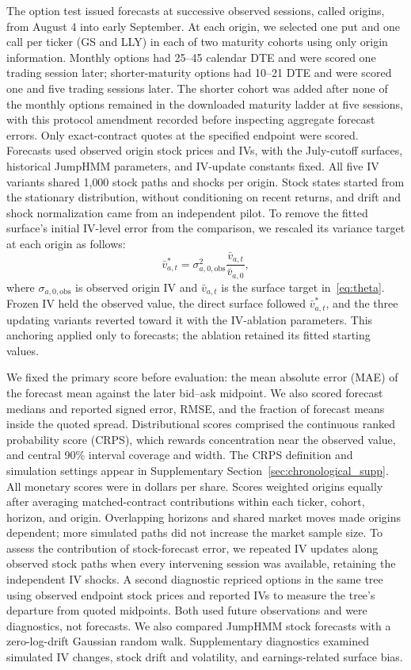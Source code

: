 The option test issued forecasts at successive observed sessions, called origins, from August 4 into early September. At each origin, we selected one put and one call per ticker (GS and LLY) in each of two maturity cohorts using only origin information. Monthly options had 25--45 calendar DTE and were scored one trading session later; shorter-maturity options had 10--21 DTE and were scored one and five trading sessions later. The shorter cohort was added after none of the monthly options remained in the downloaded maturity ladder at five sessions, with this protocol amendment recorded before inspecting aggregate forecast errors. Only exact-contract quotes at the specified endpoint were scored. Forecasts used observed origin stock prices and IVs, with the July-cutoff surfaces, historical JumpHMM parameters, and IV-update constants fixed. All five IV variants shared 1{,}000 stock paths and shocks per origin. Stock states started from the stationary distribution, without conditioning on recent returns, and drift and shock normalization came from an independent pilot. To remove the fitted surface's initial IV-level error from the comparison, we rescaled its variance target at each origin as follows:
\begin{equation}\label{eq:origin_anchor}
\bar v^{*}_{a,t}=\sigma_{a,0,\mathrm{obs}}^2
\frac{\bar v_{a,t}}{\bar v_{a,0}},
\end{equation}
where $\sigma_{a,0,\mathrm{obs}}$ is observed origin IV and $\bar v_{a,t}$ is the surface target in~\eqref{eq:theta}. Frozen IV held the observed value, the direct surface followed $\bar v^{*}_{a,t}$, and the three updating variants reverted toward it with the IV-ablation parameters. This anchoring applied only to forecasts; the ablation retained its fitted starting values.

We fixed the primary score before evaluation: the mean absolute error (MAE) of the forecast mean against the later bid--ask midpoint. We also scored forecast medians and reported signed error, RMSE, and the fraction of forecast means inside the quoted spread. Distributional scores comprised the continuous ranked probability score (CRPS), which rewards concentration near the observed value, and central 90\% interval coverage and width. The CRPS definition and simulation settings appear in Supplementary Section~\ref{sec:chronological_supp}. All monetary scores were in dollars per share. Scores weighted origins equally after averaging matched-contract contributions within each ticker, cohort, horizon, and origin. Overlapping horizons and shared market moves made origins dependent; more simulated paths did not increase the market sample size. To assess the contribution of stock-forecast error, we repeated IV updates along observed stock paths when every intervening session was available, retaining the independent IV shocks. A second diagnostic repriced options in the same tree using observed endpoint stock prices and reported IVs to measure the tree's departure from quoted midpoints. Both used future observations and were diagnostics, not forecasts. We also compared JumpHMM stock forecasts with a zero-log-drift Gaussian random walk. Supplementary diagnostics examined simulated IV changes, stock drift and volatility, and earnings-related surface bias.
